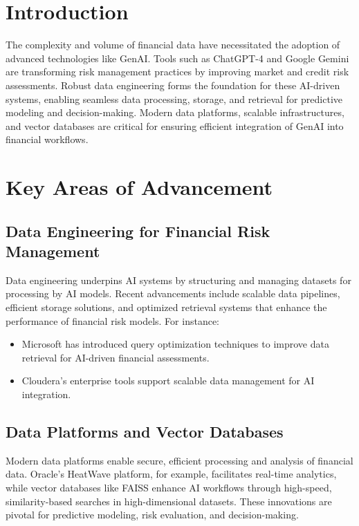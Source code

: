 \documentclass[a4paper,headinclude=on,footinclude=on,12pt,oneside]{scrbook}
\begin{document}
\section{Introduction}
The complexity and volume of financial data have necessitated the adoption of advanced technologies like GenAI. Tools such as ChatGPT-4 and Google Gemini are transforming risk management practices by improving market and credit risk assessments. Robust data engineering forms the foundation for these AI-driven systems, enabling seamless data processing, storage, and retrieval for predictive modeling and decision-making. Modern data platforms, scalable infrastructures, and vector databases are critical for ensuring efficient integration of GenAI into financial workflows.

\section{Key Areas of Advancement}
\subsection{Data Engineering for Financial Risk Management}
Data engineering underpins AI systems by structuring and managing datasets for processing by AI models. Recent advancements include scalable data pipelines, efficient storage solutions, and optimized retrieval systems that enhance the performance of financial risk models. For instance:
\begin{itemize}
	\item Microsoft has introduced query optimization techniques to improve data retrieval for AI-driven financial assessments.
	\item Cloudera's enterprise tools support scalable data management for AI integration.
\end{itemize}

\subsection{Data Platforms and Vector Databases}
Modern data platforms enable secure, efficient processing and analysis of financial data. Oracle's HeatWave platform, for example, facilitates real-time analytics, while vector databases like FAISS enhance AI workflows through high-speed, similarity-based searches in high-dimensional datasets. These innovations are pivotal for predictive modeling, risk evaluation, and decision-making.
\end{document}
